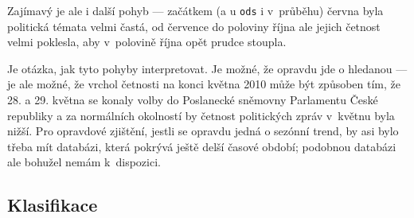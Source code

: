 \documentclass[12pt,a4paper]{report}
\begin{document}
Zajímavý je ale i další pohyb --- začátkem (a u \texttt{ods} i v~průběhu) června byla politická témata velmi častá, od července do poloviny října ale jejich četnost velmi poklesla, aby v~polovině října opět prudce stoupla.

Je otázka, jak tyto pohyby interpretovat. Je možné, že opravdu jde o hledanou  --- je ale možné, že vrchol četnosti na konci května 2010 může být způsoben tím, že 28. a 29. května se konaly volby do Poslanecké sněmovny Parlamentu České republiky a za normálních okolností by četnost politických zpráv v~květnu byla nižší. Pro opravdové zjištění, jestli se opravdu jedná o sezónní trend, by asi bylo třeba mít databázi, která pokrývá ještě delší časové období; podobnou databázi ale bohužel nemám k~dispozici.


\subsection{Klasifikace}
\label{sec:klasifikace_priklady}
\end{document}
